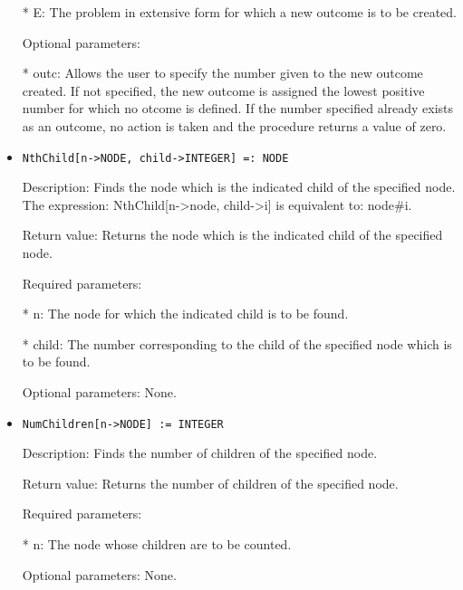 \begin{itemize}
\bd
\item
[* E:] The problem in extensive form for which a new outcome is to
be created.
\ed

\item
[Optional parameters:]\hfil\null

\bd
\item
[* outc:] Allows the user to specify the number given to the new 
outcome created.  If not specified, the new outcome is assigned the 
lowest positive number for which no otcome is defined.  If the number
specified already exists as an outcome, no action is taken and the 
procedure returns a value of zero.
\ed
\ed

\item
\begin{verbatim}
NthChild[n->NODE, child->INTEGER] =: NODE
\end{verbatim}

\bd
\item
[Description:] Finds the node which is the indicated child of the 
specified node.  The expression: NthChild[n->node, child->i] is 
equivalent to:  node\#i.
\item
[Return value:] Returns the node which is the indicated child of the
specified node.
\item
[Required parameters:]\hfil\null
	  
\bd
\item
[* n:] The node for which the indicated child is to be found.
\item
[* child:] The number corresponding to the child of the specified 
node which is to be found.
\ed

\item 
[Optional parameters:] None.
\ed

\item
\begin{verbatim}
NumChildren[n->NODE] := INTEGER
\end{verbatim}

\bd
\item
[Description:] Finds the number of children of the specified node.
\item
[Return value:] Returns the number of children of the specified node.
\item
[Required parameters:]\hfil\null

\bd
\item
[* n:] The node whose children are to be counted.
\ed

\item
[Optional parameters:] None.
\ed


\end{itemize}
